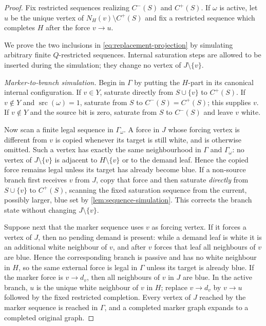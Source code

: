 \documentclass[11pt,reqno]{amsart}
\theoremstyle{definition}
\begin{document}
\begin{proof}
Fix restricted sequences realizing $C^-(S)$ and $C^+(S)$.  If $\omega$ is
active, let $u$ be the unique vertex of
$N_H(v)\setminus C^+(S)$ and fix a restricted sequence which completes $H$
after the force $v\to u$.

We prove the two inclusions in \eqref{eq:replacement-projection} by simulating
arbitrary finite $Q$-restricted sequences.  Internal saturation steps are
allowed to be inserted during the simulation; they change no vertex of
$J\setminus\{v\}$.

\smallskip
\noindent\emph{Marker-to-branch simulation.}
Begin in $\Gamma$ by putting the $H$-part in its canonical internal
configuration.  If $v\in Y$, saturate directly from $S\cup\{v\}$ to
$C^+(S)$.  If $v\notin Y$ and $\operatorname{src}(\omega)=1$, saturate from
$S$ to $C^-(S)=C^+(S)$; this supplies $v$.  If $v\notin Y$ and the source bit
is zero, saturate from $S$ to $C^-(S)$ and leave $v$ white.

Now scan a finite legal sequence in $\Gamma_\omega$.  A force in $J$ whose
forcing vertex is different from $v$ is copied whenever its target is still
white, and is otherwise omitted.  Such a vertex has exactly the same
neighbourhood in $\Gamma$ and $\Gamma_\omega$: no vertex of
$J\setminus\{v\}$ is adjacent to $H\setminus\{v\}$ or to the demand
leaf.  Hence the copied force remains legal unless its target has already
become blue.  If a non-source branch first receives $v$ from $J$,
copy that force and then saturate \emph{directly} from $S\cup\{v\}$ to
$C^+(S)$, scanning the fixed saturation sequence from the current, possibly
larger, blue set by \cref{lem:sequence-simulation}.  This corrects the branch
state without changing $J\setminus\{v\}$.

Suppose next that the marker sequence uses $v$ as forcing vertex.  If it
forces a vertex of $J$, then no pending demand is present: while a demand leaf
is white it is an additional white neighbour of $v$, and after $v$ forces that
leaf all neighbours of $v$ are blue.  Hence the corresponding branch is
passive and has no white neighbour in $H$, so the same external force is legal
in $\Gamma$ unless its target is already blue.  If the marker force is $v\to d_v$, then all neighbours of $v$
in $J$ are blue.  In the active branch, $u$ is the unique white neighbour of
$v$ in $H$; replace $v\to d_v$ by $v\to u$ followed by the fixed restricted
completion.  Every vertex of $J$ reached by the marker sequence is
reached in $\Gamma$, and a completed marker graph expands to a completed
original graph.


\end{proof}
\end{document}
